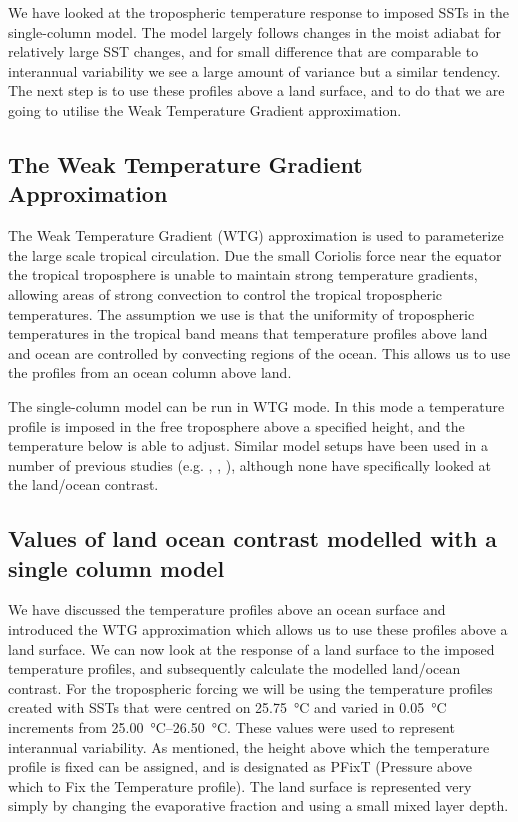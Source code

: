 We have looked at the tropospheric temperature response to imposed SSTs in the 
single-column model. The model largely follows changes in the moist adiabat for 
relatively large SST changes, and for small difference that are comparable to 
interannual variability we see a large amount of variance but a similar 
tendency. The next step is to use these profiles above a land surface, and to do 
that we are going to utilise the Weak Temperature Gradient approximation.

\subsection{The Weak Temperature Gradient Approximation}
The Weak Temperature Gradient (WTG) approximation is used to parameterize the 
large scale tropical circulation. Due the small Coriolis force near the equator 
the tropical troposphere is unable to maintain strong temperature gradients, 
allowing areas of strong convection to control the tropical tropospheric 
temperatures.  The assumption we use is that the uniformity of tropospheric 
temperatures in the tropical band means that temperature profiles above land and 
ocean are controlled by convecting regions of the ocean. This allows us to use 
the profiles from an ocean column above land.

The single-column model can be run in WTG mode. In this mode a temperature 
profile is imposed in the free troposphere above a specified height, and the 
temperature below is able to adjust. Similar model setups have been used in a 
number of previous studies (e.g. \citet{Sobel2000}, \citet{Lintner2005}, 
\citet{Ramsay2011}), although none have specifically looked at the land/ocean 
contrast.

\subsection{Values of land ocean contrast modelled with a single column model}
\label{sec:scmrlo}

We have discussed the temperature profiles above an ocean surface and introduced 
the WTG approximation which allows us to use these profiles above a land 
surface.  We can now look at the response of a land surface to the imposed 
temperature profiles, and subsequently calculate the modelled land/ocean 
contrast.  For the tropospheric forcing we will be using the temperature 
profiles created with SSTs that were centred on \SI{25.75}{\celsius} and varied 
in \SI{0.05}{\celsius} increments from \SIrange{25.00}{26.50}{\celsius}. These 
values were used to represent interannual variability. As mentioned, the height 
above which the temperature profile is fixed can be assigned, and is designated 
as PFixT (Pressure above which to Fix the Temperature profile).  The land 
surface is represented very simply by changing the evaporative fraction and 
using a small mixed layer depth.

